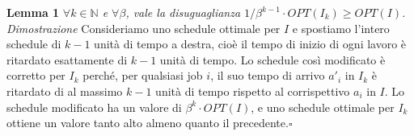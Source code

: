 \documentclass[12pt]{article}
\newcommand*{\N}{\mathbb{N}}
\begin{document}
\textbf{Lemma 1}
\textit{$\forall k \in \N$ e $\forall \beta$, vale la disuguaglianza $1/\beta^{k-1} \cdot OPT(I_{k}) \geq OPT(I)$.}\newline\newline
\textit{Dimostrazione}
Consideriamo uno schedule ottimale per $I$ e spostiamo l'intero schedule di $k - 1$ unità di tempo a destra, cioè il tempo di inizio di ogni lavoro è ritardato esattamente di $k - 1$ unità di tempo. Lo schedule così modificato è corretto per $I_{k}$ perché, per qualsiasi job $i$, il suo tempo di arrivo $a'_{i}$ in $I_{k}$ è ritardato di al massimo $k - 1$ unità di tempo rispetto al corrispettivo $a_{i}$ in $I$. Lo schedule modificato ha un valore di $\beta^{k} \cdot OPT(I)$, e uno schedule ottimale per $I_{k}$ ottiene un valore tanto alto almeno quanto il precedente.\hfill $\square$ \vspace{5mm}
\end{document}
